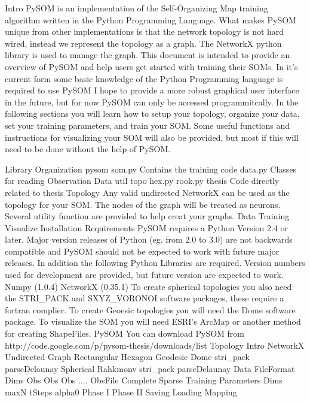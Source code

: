 Intro
    PySOM is an implementation of the Self-Organizing Map training algorithm written in the Python Programming Language.  What makes PySOM unique from other implementations is that the network topology is not hard wired, instead we represent the topology as a graph.  The NetworkX python library is used to manage the graph.  This document is intended to provide an overview of PySOM and help users get started with training their SOMs.  In it's current form some basic knowledge of the Python Programming language is required to use PySOM I hope to provide a more robust graphical user interface in the future, but for now PySOM can only be accessed programmitcally.  In the following sections you will learn how to setup your topology, organize your data, set your training parameters, and train your SOM.  Some useful functions and instructions for visualizing your SOM will also be provided, but most if this will need to be done without the help of PySOM.

    Library Organization
        pysom
            som.py
                Contains the training code
            data.py
                Classes for reading Observation Data
            util
            topo
                hex.py
                rook.py
            thesis
                Code directly related to thesis
    Topology
        Any valid undirected NetworkX can be used as the topology for your SOM.  The nodes of the graph will be treated as neurons.
        Several utility function are provided to help creat your graphs.
    Data
    Training
    Visualize
Installation
    Requirements
        PySOM requires a Python Version 2.4 or later.  Major version releases of Python (eg. from 2.0 to 3.0) are not backwards compatible and PySOM should not be expected to work with future major releases.
        In addition the following Python Libraries are required.
        Version numbers used for development are provided, but future version are expected to work.
        Numpy (1.0.4)
        NetworkX (0.35.1)
        To create spherical topologies you also need the STRI_PACK and SXYZ_VORONOI software packages, these require a fortran complier.
        To create Geoesic topologies you will need the Dome software package.
        To visualize the SOM you will need ESRI's ArcMap or another method for creating ShapeFiles.
    PySOM
        You can download PySOM from http://code.google.com/p/pysom-thesis/downloads/list
Topology
    Intro
        NetworkX Undirected Graph
    Rectangular
    Hexagon
    Geodesic
        Dome
        stri_pack
        parseDelaunay
    Spherical
        Rahkmonv
        stri_pack
        parseDelaunay
Data
    FileFormat
        Dims
        Obs
        Obs
        Obs
        ....
    ObsFile
        Complete
        Sparse
Training
    Parameters
        Dims
        maxN
        tSteps
        alpha0
    Phase I
    Phase II
Saving
Loading
Mapping

